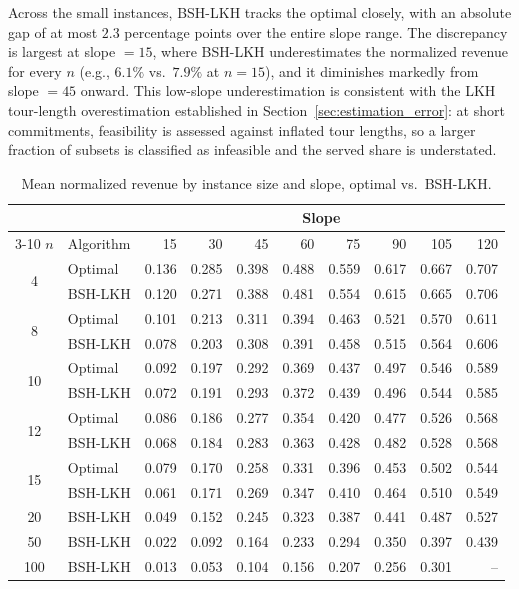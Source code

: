 \documentclass[11pt]{article}
\theoremstyle{plain}
\theoremstyle{definition}
\begin{document}
Across the small instances, BSH-\ac{LKH} tracks the optimal closely, with an absolute gap
of at most $2.3$ percentage points over the entire slope range. The discrepancy is largest
at slope $= 15$, where BSH-\ac{LKH} underestimates the normalized revenue for every $n$
(e.g., $6.1\%$ vs.\ $7.9\%$ at $n = 15$), and it diminishes markedly from slope $= 45$
onward.
This low-slope underestimation is consistent with the \ac{LKH} tour-length overestimation
established in Section~\ref{sec:estimation_error}: at short commitments, feasibility is
assessed against inflated tour lengths, so a larger fraction of subsets is classified as
infeasible and the served share is understated.


\begin{table}[t]
\centering
\small
\begin{tabular}{c l rrrrrrrr}
	\toprule
	& & \multicolumn{8}{c}{Slope} \\
	\cmidrule(lr){3-10}
	$n$ & Algorithm & 15 & 30 & 45 & 60 & 75 & 90 & 105 & 120 \\
	\midrule
	\multirow{2}{*}{4} & Optimal & 0.136 & 0.285 & 0.398 & 0.488 & 0.559 & 0.617 & 0.667 & 0.707 \\
	& BSH-LKH & 0.120 & 0.271 & 0.388 & 0.481 & 0.554 & 0.615 & 0.665 & 0.706 \\
	\midrule
	\multirow{2}{*}{8} & Optimal & 0.101 & 0.213 & 0.311 & 0.394 & 0.463 & 0.521 & 0.570 & 0.611 \\
	& BSH-LKH & 0.078 & 0.203 & 0.308 & 0.391 & 0.458 & 0.515 & 0.564 & 0.606 \\
	\midrule
	\multirow{2}{*}{10} & Optimal & 0.092 & 0.197 & 0.292 & 0.369 & 0.437 & 0.497 & 0.546 & 0.589 \\
	& BSH-LKH & 0.072 & 0.191 & 0.293 & 0.372 & 0.439 & 0.496 & 0.544 & 0.585 \\
	\midrule
	\multirow{2}{*}{12} & Optimal & 0.086 & 0.186 & 0.277 & 0.354 & 0.420 & 0.477 & 0.526 & 0.568 \\
	& BSH-LKH & 0.068 & 0.184 & 0.283 & 0.363 & 0.428 & 0.482 & 0.528 & 0.568 \\
	\midrule
	\multirow{2}{*}{15} & Optimal & 0.079 & 0.170 & 0.258 & 0.331 & 0.396 & 0.453 & 0.502 & 0.544 \\
	& BSH-LKH & 0.061 & 0.171 & 0.269 & 0.347 & 0.410 & 0.464 & 0.510 & 0.549 \\
	\midrule
	\multirow{1}{*}{20} & BSH-LKH & 0.049 & 0.152 & 0.245 & 0.323 & 0.387 & 0.441 & 0.487 & 0.527 \\
	\midrule
	\multirow{1}{*}{50} & BSH-LKH & 0.022 & 0.092 & 0.164 & 0.233 & 0.294 & 0.350 & 0.397 & 0.439 \\
	\midrule
	\multirow{1}{*}{100} & BSH-LKH & 0.013 & 0.053 & 0.104 & 0.156 & 0.207 & 0.256 & 0.301 & -- \\
	\bottomrule
\end{tabular}
\caption{Mean normalized revenue by instance size and slope, optimal vs.\ BSH-\ac{LKH}.}
\label{tab:norm_revenue_slope_grid}
\end{table}
\end{document}
